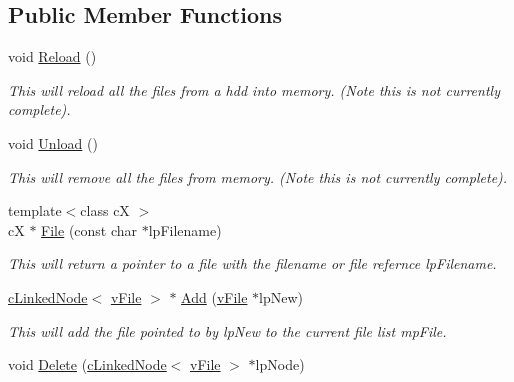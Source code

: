 \subsection*{Public Member Functions}
\begin{DoxyCompactItemize}
\item 
\hypertarget{classc_file_handler_a87ff1f0cc36ef46514f77826eaf04453}{
void \hyperlink{classc_file_handler_a87ff1f0cc36ef46514f77826eaf04453}{Reload} ()}
\label{classc_file_handler_a87ff1f0cc36ef46514f77826eaf04453}

\begin{DoxyCompactList}\small\item\em This will reload all the files from a hdd into memory. (Note this is not currently complete). \end{DoxyCompactList}\item 
\hypertarget{classc_file_handler_a610399fa5d6bdb45de1d3cdc4dcb4c3c}{
void \hyperlink{classc_file_handler_a610399fa5d6bdb45de1d3cdc4dcb4c3c}{Unload} ()}
\label{classc_file_handler_a610399fa5d6bdb45de1d3cdc4dcb4c3c}

\begin{DoxyCompactList}\small\item\em This will remove all the files from memory. (Note this is not currently complete). \end{DoxyCompactList}\item 
\hypertarget{classc_file_handler_a864b6417cc0aee624d51f3e95962a581}{
{\footnotesize template$<$class cX $>$ }\\cX $\ast$ \hyperlink{classc_file_handler_a864b6417cc0aee624d51f3e95962a581}{File} (const char $\ast$lpFilename)}
\label{classc_file_handler_a864b6417cc0aee624d51f3e95962a581}

\begin{DoxyCompactList}\small\item\em This will return a pointer to a file with the filename or file refernce lpFilename. \end{DoxyCompactList}\item 
\hypertarget{classc_file_handler_af2e846b2f4f519032b8892a2b5f66025}{
\hyperlink{classc_linked_node}{cLinkedNode}$<$ \hyperlink{classv_file}{vFile} $>$ $\ast$ \hyperlink{classc_file_handler_af2e846b2f4f519032b8892a2b5f66025}{Add} (\hyperlink{classv_file}{vFile} $\ast$lpNew)}
\label{classc_file_handler_af2e846b2f4f519032b8892a2b5f66025}

\begin{DoxyCompactList}\small\item\em This will add the file pointed to by lpNew to the current file list mpFile. \end{DoxyCompactList}\item 
\hypertarget{classc_file_handler_a2701aa77518747a401b51e0c38ba1cd1}{
void \hyperlink{classc_file_handler_a2701aa77518747a401b51e0c38ba1cd1}{Delete} (\hyperlink{classc_linked_node}{cLinkedNode}$<$ \hyperlink{classv_file}{vFile} $>$ $\ast$lpNode)}
\label{classc_file_handler_a2701aa77518747a401b51e0c38ba1cd1}


\end{DoxyCompactItemize}

